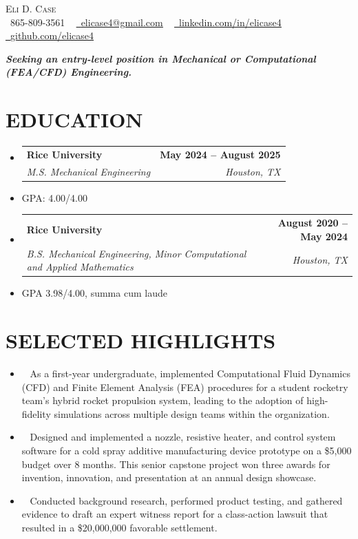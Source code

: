 \documentclass[letterpaper,11pt]{article}
\makeatletter
\newcommand{\resumeItem}[1]{
  \item \small{
    {#1 \vspace{-2pt}}
  }
}
\newcommand{\highlightItem}[1]{
  \item \textendash\ \small{
    {#1 \vspace{-2pt}}
  }
}
\newcommand{\resumeSubheading}[4]{
  \vspace{-2pt}\item
    \begin{tabular*}{1.0\textwidth}[t]{l@{\extracolsep{\fill}}r}
      \textbf{#1} & \textbf{\small #2} \\
      \textit{\small#3} & \textit{\small #4} \\
    \end{tabular*}\vspace{-7pt}
}
\newcommand{\resumeSubHeadingListStart}{\begin{itemize}[leftmargin=0.0in, label={}]}
\newcommand{\resumeSubHeadingListEnd}{\end{itemize}}
\makeatother
\begin{document}
\begin{center}
    {\large \scshape Eli D. Case} \\ \vspace{1pt}
    \small \raisebox{-0.1\height}\faPhone\ 865-809-3561 ~ \href{mailto:elicase4@gmail.com}{\raisebox{-0.2\height}\faEnvelope\  \underline{elicase4@gmail.com}} ~ 
    \href{https://linkedin.com/in/elicase4}{\raisebox{-0.2\height}\faLinkedin\ \underline{linkedin.com/in/elicase4}}  ~
    \href{https://github.com/elicase4}{\raisebox{-0.2\height}\faGithub\ \underline{github.com/elicase4}}
\end{center}

\begin{center}
  \vspace{4pt}
  \textit{\textbf{Seeking an entry-level position in Mechanical or Computational (FEA/CFD) Engineering.}}
  \vspace{-2pt}
\end{center}

\section{EDUCATION}

  \resumeSubHeadingListStart
    
    \resumeSubheading
      {Rice University}{May 2024 -- August 2025}
      {M.S. Mechanical Engineering}{Houston, TX}
      \resumeItem{GPA: 4.00/4.00}
    \resumeSubheading
      {Rice University}{August 2020 -- May 2024}
      {B.S. Mechanical Engineering, Minor Computational and Applied Mathematics}{Houston, TX}
      \resumeItem{GPA 3.98/4.00, summa cum laude}

  \resumeSubHeadingListEnd
\vspace{-16pt}

\section{SELECTED HIGHLIGHTS}
 \begin{itemize}[leftmargin=0.15in, label={}]
    \highlightItem{As a first-year undergraduate, implemented Computational Fluid Dynamics (CFD) and Finite Element Analysis (FEA) procedures for a student rocketry team's hybrid rocket propulsion system, leading to the adoption of high-fidelity simulations across multiple design teams within the organization.}

    \highlightItem{Designed and implemented a nozzle, resistive heater, and control system software for a cold spray additive manufacturing device prototype on a \$5,000 budget over 8 months. This senior capstone project won three awards for invention, innovation, and presentation at an annual design showcase.}

    \highlightItem{Conducted background research, performed product testing, and gathered evidence to draft an expert witness report for a class-action lawsuit that resulted in a \$20,000,000 favorable settlement.} 
    
\end{itemize}
\vspace{-16pt}
\end{document}
